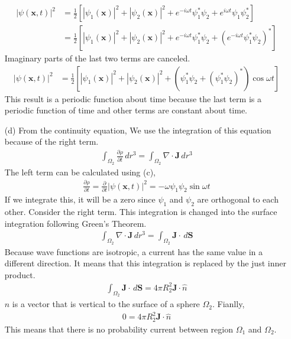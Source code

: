 \documentclass[floatfix,nofootinbib,superscriptaddress,fleqn]{revtex4}
\begin{document}
\begin{itemize}
\begin{align}
    |\psi(\bm{x},t)|^2&= \frac{1}{2}\left[|\psi_1(\bm{x})|^2 
    +|\psi_2(\bm{x})|^2
    +e^{-i\omega t}\psi_1^*\psi_2
    +e^{i\omega t}\psi_1\psi_2^*\right]  \\
    &=\frac{1}{2}\left[ |\psi_1(\bm{x})|^2 
    +|\psi_2(\bm{x})|^2 
    +e^{-i\omega t}\psi_1^*\psi_2 
    +{\left(e^{-i\omega t}\psi_1^*\psi_2\right)}^*\right]
  \end{align}
  Imaginary parts of the last two terms are canceled.
  \begin{align}  
    |\psi(\bm{x},t)|^2 &= \frac{1}{2}\left[ |\psi_1(\bm{x})|^2 
    +|\psi_2(\bm{x})|^2 
    +\left(\psi_1^*\psi_2 
    +{\left(\psi_1^*\psi_2\right)}^*\right)\cos{\omega t} \right]
  \end{align}
  This result is a periodic function about time 
  because the last term is a periodic function of 
  time and other terms are constant about time.

\item[(d)]
  From the continuity equation, We use the integration of 
  this equation because of the right term.
  \begin{align}
    \int_{\Omega_2}\frac{\partial \rho}{\partial t}\,dr^3 
    = \int_{\Omega_2}\nabla \cdot \bm{J}\,dr^3
  \end{align}
  The left term can be calculated using (c),
  \begin{align}
    \frac{\partial\rho}{\partial t} = \frac{\partial}{\partial t}|
    \psi(\bm{x},t)|^2 
    = -\omega \psi_1\psi_2\sin\omega t
  \end{align}
  If we integrate this, it will be a zero since $\psi_1$ and 
  $\psi_2$ are orthogonal to each other. Consider the right term. 
  This integration is changed into the surface integration following 
  Green's Theorem.
  \begin{align}
    \int_{\Omega_2}\nabla \cdot \bm{J}\,dr^3 
    =\int_{\Omega_2}\bm{J}\cdot\,d\bm{S}
  \end{align}
  Because wave functions are isotropic, a current has the same value 
  in a different direction. It means that this integration is replaced 
  by the just inner product.
  \begin{align}
    \int_{\Omega_2} \bm{J} \cdot\,d\bm{S} = 4\pi R_2^2\bm{J}\cdot\hat{n}
  \end{align}
  $\hat{n}$ is a vector that is vertical to the surface of 
  a sphere $\Omega_2$. Fianlly,
  \begin{align}
    0 = 4\pi R_2^2\bm{J}\cdot\hat{n}
  \end{align}
  This means that there is no probability current between 
  region $\Omega_1$ and $\Omega_2$.
\end{itemize}
\end{document}
